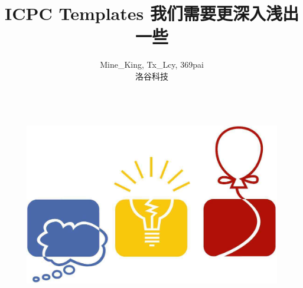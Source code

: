 \documentclass[12pt]{report}
\title{\Huge \textbf{ICPC Templates} \linebreak \linebreak \large \textcolor{primary-blue}{\textbf{我们需要更深入浅出一些}}}
\author{Mine\_King, Tx\_Lcy, 369pai \\ \small 洛谷科技}
\begin{document}
\setlength{\headheight}{5mm}
\setlength{\headsep}{5mm}

\begin{titlepage}
    \begin{figure}
        \centering
        \includegraphics[height=8cm]{images/logo.jpg}
    \end{figure}
    
    \maketitle
\end{titlepage}


\tableofcontents       %
\clearpage


\newpage
\setcounter{page}{1}   %



%

%

%

%

%

%

\end{document}
